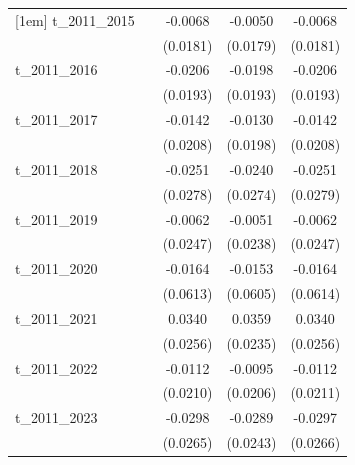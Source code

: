 \begin{table}[htbp]
\begin{tabular}{l*{4}{c}}
[1em]
t\_2011\_2015 &                     &     -0.0068         &     -0.0050         &     -0.0068         \\
            &                     &    (0.0181)         &    (0.0179)         &    (0.0181)         \\
[1em]
t\_2011\_2016 &                     &     -0.0206         &     -0.0198         &     -0.0206         \\
            &                     &    (0.0193)         &    (0.0193)         &    (0.0193)         \\
[1em]
t\_2011\_2017 &                     &     -0.0142         &     -0.0130         &     -0.0142         \\
            &                     &    (0.0208)         &    (0.0198)         &    (0.0208)         \\
[1em]
t\_2011\_2018 &                     &     -0.0251         &     -0.0240         &     -0.0251         \\
            &                     &    (0.0278)         &    (0.0274)         &    (0.0279)         \\
[1em]
t\_2011\_2019 &                     &     -0.0062         &     -0.0051         &     -0.0062         \\
            &                     &    (0.0247)         &    (0.0238)         &    (0.0247)         \\
[1em]
t\_2011\_2020 &                     &     -0.0164         &     -0.0153         &     -0.0164         \\
            &                     &    (0.0613)         &    (0.0605)         &    (0.0614)         \\
[1em]
t\_2011\_2021 &                     &      0.0340         &      0.0359         &      0.0340         \\
            &                     &    (0.0256)         &    (0.0235)         &    (0.0256)         \\
[1em]
t\_2011\_2022 &                     &     -0.0112         &     -0.0095         &     -0.0112         \\
            &                     &    (0.0210)         &    (0.0206)         &    (0.0211)         \\
[1em]
t\_2011\_2023 &                     &     -0.0298         &     -0.0289         &     -0.0297         \\
            &                     &    (0.0265)         &    (0.0243)         &    (0.0266)         \\

\end{tabular}
\end{table}
